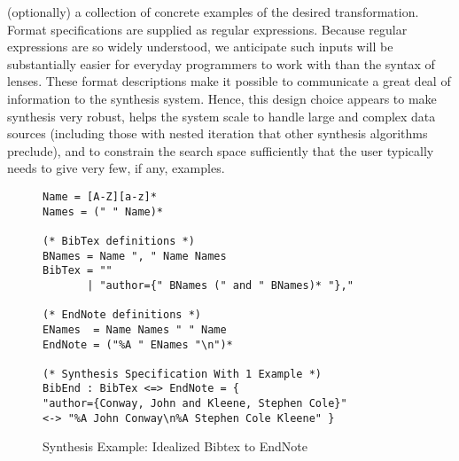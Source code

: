 \documentclass[numbers,10pt,preprint\ifanon ,nocopyrightspace\fi]{sigplanconf}
\begin{document}
(optionally) a collection of concrete examples of the desired
transformation.  Format specifications are supplied as regular expressions.
Because regular expressions are so widely understood, we anticipate such
inputs will be substantially easier for everyday programmers to work with
than the syntax of lenses.  These format descriptions make it possible to
communicate a great deal of information to the synthesis system.  Hence, this
design choice appears to make synthesis very robust, helps the system scale
to handle large and complex data sources (including those with nested
iteration that other synthesis algorithms preclude), and to constrain the
search space sufficiently that the user typically needs to give very few, if
any, examples.



\begin{figure}
\begin{lstlisting}
Name = [A-Z][a-z]*
Names = (" " Name)*

(* BibTex definitions *)
BNames = Name ", " Name Names
BibTex = ""
       | "author={" BNames (" and " BNames)* "},"

(* EndNote definitions *)
ENames  = Name Names " " Name
EndNote = ("%A " ENames "\n")*

(* Synthesis Specification With 1 Example *)
BibEnd : BibTex <=> EndNote = {
"author={Conway, John and Kleene, Stephen Cole}"
<-> "%A John Conway\n%A Stephen Cole Kleene" }
\end{lstlisting}
  \caption{Synthesis Example: Idealized Bibtex to EndNote}
  \label{fig:bibend-spec}
\end{figure}
\end{document}
